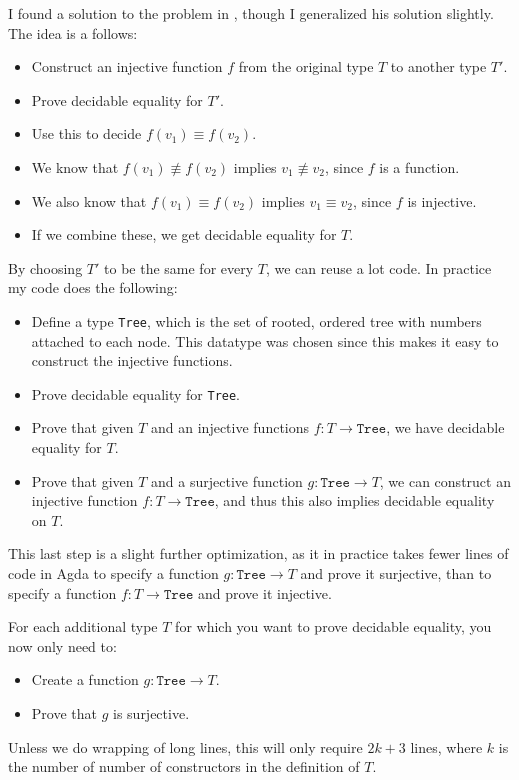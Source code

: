 I found a solution to the problem in \cite{deceq}, though I generalized his
solution slightly. The idea is a follows:

\begin{itemize}
\item Construct an injective function $f$ from the original type $T$ to another
  type $T'$.
\item Prove decidable equality for $T'$.
\item Use this to decide $f(v_1) \equiv f(v_2)$.
\item We know that $f(v_1) \not\equiv f(v_2)$ implies $v_1 \not\equiv v_2$,
  since $f$ is a function.
\item We also know that $f(v_1) \equiv f(v_2)$ implies $v_1 \equiv v_2$, since
  $f$ is injective.
\item If we combine these, we get decidable equality for $T$.
\end{itemize}

By choosing $T'$ to be the same for every $T$, we can reuse a lot code. In
practice my code does the following:

\begin{itemize}
\item Define a type \texttt{Tree}, which is the set of rooted, ordered tree with
  numbers attached to each node. This datatype was chosen since this makes it
  easy to construct the injective functions.
\item Prove decidable equality for \texttt{Tree}.
\item Prove that given $T$ and an injective functions $f : T \to \mathtt{Tree}$,
  we have decidable equality for $T$.
\item Prove that given $T$ and a surjective function $g : \mathtt{Tree} \to T$,
  we can construct an injective function $f : T \to \mathtt{Tree}$, and thus
  this also implies decidable equality on $T$.
\end{itemize}

This last step is a slight further optimization, as it in practice takes fewer
lines of code in Agda to specify a function $g : \mathtt{Tree} \to T$ and prove
it surjective, than to specify a function $f : T \to \mathtt{Tree}$ and prove it
injective.

For each additional type $T$ for which you want to prove decidable equality, you
now only need to:

\begin{itemize}
\item Create a function $g : \mathtt{Tree} \to T$.
\item Prove that $g$ is surjective.
\end{itemize}

Unless we do wrapping of long lines, this will only require $2k+3$ lines, where
$k$ is the number of number of constructors in the definition of $T$.

